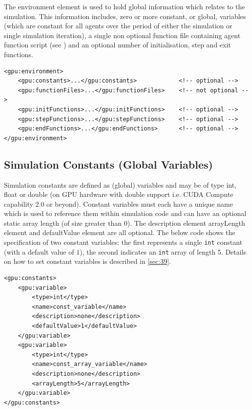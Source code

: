 \documentclass[11pt, a4paper, onecolumn, oneside]{report}
\begin{document}
The environment element is used to hold global information which relates to the simulation.
This information includes, zero or more constant, or global, variables (which are constant for all agents over the period of either the simulation or single simulation iteration), a single non optional function file containing agent function script (see ) and an optional number of initialisation, step and exit functions.

\begin{verbatim}
<gpu:environment>
    <gpu:constants>...</gpu:constants>            <!-- optional -->
    <gpu:functionFiles>...</gpu:functionFiles>    <!-- not optional -->
    <gpu:initFunctions>...</gpu:initFunctions>    <!-- optional -->
    <gpu:stepFunctions>...</gpu:stepFunctions>    <!-- optional -->
    <gpu:endFunctions>...</gpu:endFunctions>      <!-- optional -->
</gpu:environment>
\end{verbatim}

\subsection{Simulation Constants (Global Variables)}
\label{sec:221}

Simulation constants are defined as (global) variables and may be of type int, float or double (on GPU hardware with double support i.e. CUDA Compute capability 2.0 or beyond).
Constant variables must each have a unique name which is used to reference them within simulation code and can have an optional static array length (of size greater than 0).
The description element arrayLength element and defaultValue element are all optional.
The below code shows the specification of two constant variables: the first represents a single \texttt{int} constant (with a default value of $1$), the second indicates an \texttt{int} array of length 5.
Details on how to set constant variables is described in \cref{sec:39}.

\begin{verbatim}
<gpu:constants>
    <gpu:variable>
        <type>int</type>
        <name>const_variable</name>
        <description>none</description>
        <defaultValue>1</defaultValue>
    </gpu:variable>
    <gpu:variable>
        <type>int</type>
        <name>const_array_variable</name>
        <description>none</description>
        <arrayLength>5</arrayLength>
    </gpu:variable>
</gpu:constants>
\end{verbatim}
\end{document}
